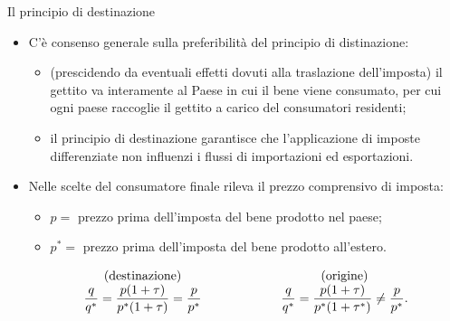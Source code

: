 \documentclass[aspectratio=149,11pt,italian]{beamer}
\begin{document}
\begin{frame}{Il principio di destinazione}
  \begin{itemize}
  \item C'è consenso generale sulla preferibilità del principio di distinazione:
  \begin{itemize}
  \item (prescidendo da eventuali effetti dovuti alla traslazione
    dell'imposta) il gettito va interamente al Paese in cui il bene viene
    consumato, per cui ogni paese raccoglie il gettito a carico del
    consumatori residenti;
  \item il principio di destinazione garantisce che l'applicazione di imposte
    differenziate non influenzi i flussi di importazioni ed esportazioni.
  \end{itemize}
\item Nelle scelte del consumatore finale rileva il prezzo comprensivo di
  imposta:
  \begin{itemize}
  \item \(p =\) prezzo prima dell'imposta del bene prodotto nel paese;
  \item \(p^* =\) prezzo prima dell'imposta del bene prodotto all'estero.
  \end{itemize}
  \begin{equation*}
\begin{array}{cp{1.5cm}c}
   \text{(destinazione)} &&  \text{(origine)} \\
   \dfrac{q}{q^*}=\dfrac{p(1+\tau)}{p^*(1+\tau)}=\dfrac{p}{p^*} &&
   \dfrac{q}{q^*}=\dfrac{p(1+\tau)}{p^*(1+\tau^*)}\not= \dfrac{p}{p^*}.
\end{array}
\end{equation*}
\end{itemize}
\end{frame}
\end{document}

